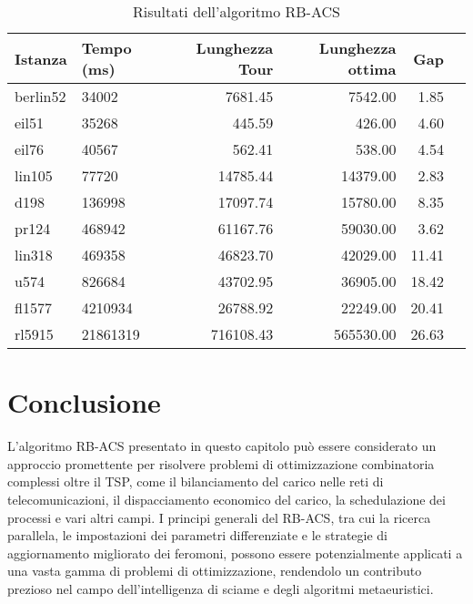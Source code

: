 \begin{table}
	\centering
	\caption{Risultati dell'algoritmo RB-ACS}
	\begin{tabular}{llrrrr}
		\toprule
		Istanza  & Tempo (ms) & Lunghezza Tour & Lunghezza ottima & Gap   \\
		\midrule
		berlin52 & 34002      & 7681.45        & 7542.00          & 1.85  \\
		eil51    & 35268      & 445.59         & 426.00           & 4.60  \\
		eil76    & 40567      & 562.41         & 538.00           & 4.54  \\
		lin105   & 77720      & 14785.44       & 14379.00         & 2.83  \\
		d198     & 136998     & 17097.74       & 15780.00         & 8.35  \\
		pr124    & 468942     & 61167.76       & 59030.00         & 3.62  \\
		lin318   & 469358     & 46823.70       & 42029.00         & 11.41 \\
		u574     & 826684     & 43702.95       & 36905.00         & 18.42 \\
		fl1577   & 4210934    & 26788.92       & 22249.00         & 20.41 \\
		rl5915   & 21861319   & 716108.43      & 565530.00        & 26.63 \\
		\bottomrule
	\end{tabular}
\end{table}

\section{Conclusione}

L'algoritmo \gls{RB-ACS} presentato in questo capitolo può essere considerato un approccio promettente per risolvere problemi di ottimizzazione combinatoria
complessi oltre il  \gls{TSP}, come il bilanciamento del carico nelle reti di telecomunicazioni,
il dispacciamento economico del carico, la schedulazione dei processi e vari altri campi. I principi generali del \gls{RB-ACS}, tra cui la ricerca parallela, le impostazioni dei parametri differenziate e le strategie di aggiornamento migliorato dei feromoni, possono essere potenzialmente applicati a una vasta gamma di problemi di ottimizzazione, rendendolo un contributo prezioso nel campo dell'intelligenza di sciame e degli algoritmi metaeuristici.

